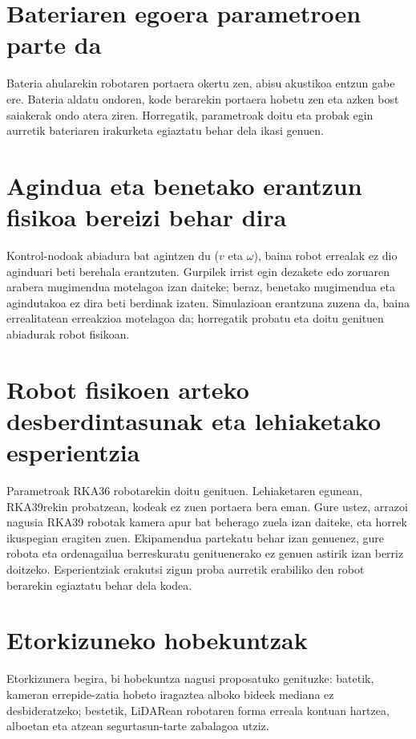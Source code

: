 \section{Bateriaren egoera parametroen parte da}

Bateria ahularekin robotaren portaera okertu zen, abisu akustikoa entzun gabe ere. Bateria aldatu ondoren, kode berarekin portaera hobetu zen eta azken bost saiakerak ondo atera ziren. Horregatik, parametroak doitu eta probak egin aurretik bateriaren irakurketa egiaztatu behar dela ikasi genuen.

\section[Agindua eta benetako erantzun fisikoa bereizi behar dira][Agindua eta benetako erantzuna]{Agindua eta benetako erantzun fisikoa bereizi behar dira}

Kontrol-nodoak abiadura bat agintzen du ($v$ eta $\omega$), baina robot errealak ez dio aginduari beti berehala erantzuten. Gurpilek irrist egin dezakete edo zoruaren arabera mugimendua motelagoa izan daiteke; beraz, benetako mugimendua eta agindutakoa ez dira beti berdinak izaten. Simulazioan erantzuna zuzena da, baina errealitatean erreakzioa motelagoa da; horregatik probatu eta doitu genituen abiadurak robot fisikoan.

\section[Robot fisikoen arteko desberdintasunak eta lehiaketako esperientzia][Robot fisikoen desberdintasunak]{Robot fisikoen arteko desberdintasunak eta lehiaketako esperientzia}

Parametroak RKA36 robotarekin doitu genituen. Lehiaketaren egunean, RKA39rekin probatzean, kodeak ez zuen portaera bera eman. Gure ustez, arrazoi nagusia RKA39 robotak kamera apur bat beherago zuela izan daiteke, eta horrek ikuspegian eragiten zuen. Ekipamendua partekatu behar izan genuenez, gure robota eta ordenagailua berreskuratu genituenerako ez genuen astirik izan berriz doitzeko. Esperientziak erakutsi zigun proba aurretik erabiliko den robot berarekin egiaztatu behar dela kodea.

\section{Etorkizuneko hobekuntzak}

Etorkizunera begira, bi hobekuntza nagusi proposatuko genituzke: batetik, kameran errepide-zatia hobeto iragaztea alboko bideek mediana ez desbideratzeko; bestetik, LiDARean robotaren forma erreala kontuan hartzea, alboetan eta atzean segurtasun-tarte zabalagoa utziz.
